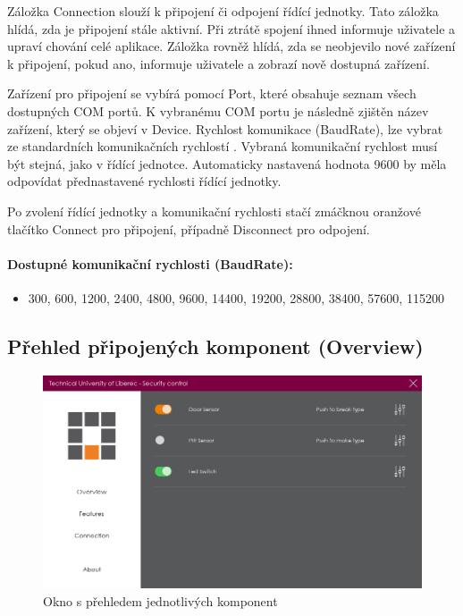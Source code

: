 \documentclass[FM,DP]{tulthesis}  %
\begin{document}
Záložka Connection slouží k připojení či odpojení řídící jednotky. Tato záložka hlídá, zda je připojení stále aktivní. Při ztrátě spojení ihned informuje uživatele a upraví chování celé aplikace. Záložka rovněž hlídá, zda se neobjevilo nové zařízení k připojení, pokud ano, informuje uživatele a zobrazí nově dostupná zařízení. 

Zařízení pro připojení se vybírá pomocí Port, které obsahuje seznam všech dostupných COM portů. K vybranému COM portu je následně zjištěn název zařízení, který se objeví v Device. Rychlost komunikace (BaudRate), lze vybrat ze standardních komunikačních rychlostí \cite{BaudRates}. Vybraná komunikační rychlost musí být stejná, jako v řídící jednotce. Automaticky nastavená hodnota 9600 by měla odpovídat přednastavené rychlosti řídící jednotky. 

Po zvolení řídící jednotky a komunikační rychlosti stačí zmáčknou oranžové tlačítko Connect pro připojení, případně Disconnect pro odpojení.  

\paragraph{Dostupné komunikační rychlosti (BaudRate):}
\begin{itemize}
\item 300, 600, 1200, 2400, 4800, 9600, 14400, 19200, 28800, 38400, 57600, 115200
\end{itemize} 

\subsection{Přehled připojených komponent (Overview)}

\begin{figure}[H]
\begin{center}
\includegraphics[width=\textwidth]{images/overview.png}
\caption{Okno s přehledem jednotlivých komponent}
\label{image}
\end{center}
\end{figure}
\end{document}
